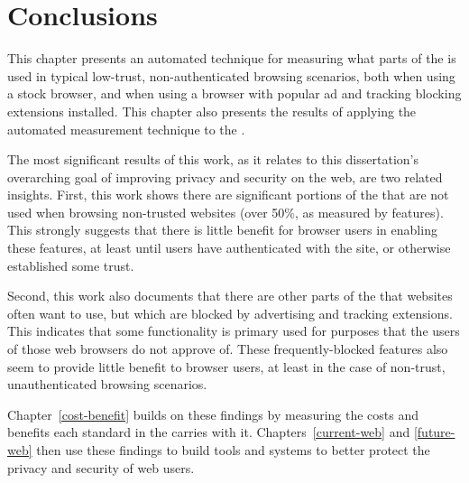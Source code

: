 \section{Conclusions}
\label{measurement:conclusions}

This chapter presents an automated technique for measuring what parts of the
\WAPI is used in typical low-trust, non-authenticated browsing scenarios, both
when using a stock browser, and when using a browser with popular ad and
tracking blocking extensions installed.  This chapter also presents the results
of applying the automated measurement technique to the \ATK.

The most significant results of this work, as it relates to this
dissertation's overarching goal of improving privacy and security on the web,
are two related insights.  First, this work shows there are significant
portions of the \WAPI that are not used when browsing non-trusted websites
(over 50\%, as measured by \WAPI features).  This strongly suggests that there
is little benefit for browser users in enabling these features, at least until
users have authenticated with the site, or otherwise established some trust.

Second, this work also documents that there are other parts of the \WAPI
that websites often want to use, but which are blocked by advertising
and tracking extensions.  This indicates that some \WAPI functionality
is primary used for purposes that the users of those web browsers do not
approve of.  These frequently-blocked features also seem to provide little
benefit to browser users, at least in the case of non-trust, unauthenticated
browsing scenarios.

Chapter~\ref{cost-benefit} builds on these findings by measuring the costs
and benefits each standard in the \WAPI carries with it.
Chapters~\ref{current-web} and \ref{future-web} then use these findings to
build tools and systems to better protect the privacy and security of web
users.
